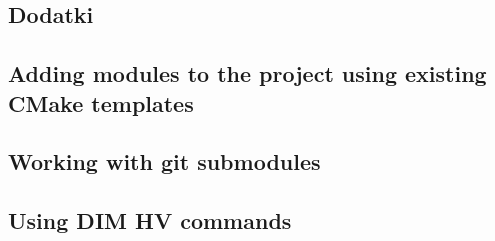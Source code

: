 \begin{appendices}
\appendix
\chapter{Dodatki}
\label{ch:extras}

\section{Adding modules to the project using existing CMake templates}

\section{Working with git submodules}

\section{Using DIM HV commands}

\end{appendices}
